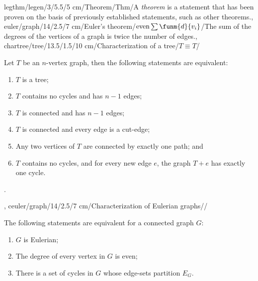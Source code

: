 legthm/legen/3/5.5/5 cm/Theorem/Thm/{A \emph{theorem} is a statement that has been proven on the basis of previously established statements, such as other theorems.},
euler/graph/14/2.5/7 cm/{Euler's theorem}/$\mbox{even}\sum{\funm{d}{v_i}}$/{The sum of the degrees of the vertices of a graph is twice the number of edges.},
chartree/tree/13.5/1.5/10 cm/{Characterization of a tree}/{$T\equiv T$}/{Let $T$ be an $n$-vertex graph, then the following statements are equivalent:\begin{enumerate}\item $T$ is a tree; \item $T$ contains no cycles and has $n-1$ edges; \item $T$ is connected and has $n-1$ edges; \item $T$ is connected and every edge is a cut-edge; \item Any two vertices of $T$ are connected by exactly one path; and \item $T$ contains no cycles, and for every new edge $e$, the graph $T+e$ has exactly one cycle.\end{enumerate}.},
ceuler/graph/14/2.5/7 cm/{Characterization of Eulerian graphs}/{}/{The following statements are equivalent for a connected graph $G$:\begin{enumerate}\item $G$ is Eulerian; \item The degree of every vertex in $G$ is even; \item There is a set of cycles in $G$ whose edge-sets partition $E_G$.\end{enumerate}}